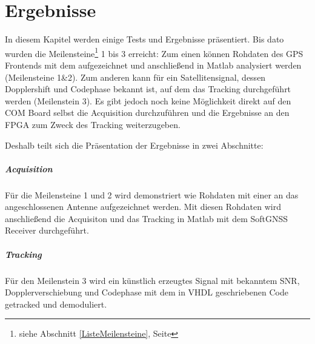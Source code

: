 \chapter{Ergebnisse}

In diesem Kapitel werden einige Tests und Ergebnisse präsentiert. Bis dato wurden die Meilensteine\footnote{siehe Abschnitt \ref{ListeMeilensteine}, Seite \pageref{ListeMeilensteine}} 1 bis 3 erreicht: Zum einen können Rohdaten des GPS Frontends mit dem \comboard aufgezeichnet und anschließend in Matlab analysiert werden (Meilensteine 1\&2). Zum anderen kann für ein Satellitensignal, dessen Dopplershift und Codephase bekannt ist, auf dem \comboard das Tracking durchgeführt werden (Meilenstein 3). Es gibt jedoch noch keine Möglichkeit direkt auf den COM Board selbst die Acquisition durchzuführen und die Ergebnisse an den FPGA zum Zweck des Tracking weiterzugeben.

Deshalb teilt sich die Präsentation der Ergebnisse in zwei Abschnitte: 

\paragraph{Acquisition} Für die Meilensteine 1 und 2 wird demonstriert wie Rohdaten mit einer an das  \comboard angeschlossenen Antenne aufgezeichnet werden. Mit diesen Rohdaten wird anschließend die Acquisiton und das Tracking in Matlab mit dem SoftGNSS Receiver durchgeführt.

\paragraph{Tracking} Für den Meilenstein 3 wird ein künstlich erzeugtes Signal mit bekanntem SNR, Dopplerverschiebung und Codephase mit dem in VHDL geschriebenen Code getracked und demoduliert.







